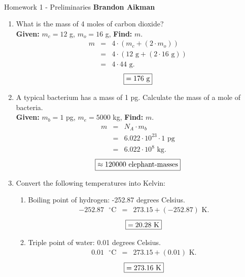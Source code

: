 \documentclass[12pt]{article}
\begin{document}
 \\
Homework 1 - Preliminaries \hfill {\bf Brandon Aikman}

\begin{enumerate}
	\item What is the mass of 4 moles of carbon dioxide? \\
	\textbf {Given: } $m_c  = 12$ g, $m_o = 16$ g, \textbf{Find: } $m$.
	\begin{eqnarray*}
		m &=& 4 \cdot (m_c + (2 \cdot m_o))\\
		&=& 4 \cdot (12 \mbox{ g} + (2 \cdot 16 \mbox{ g}))\\
		&=& 4 \cdot 44 \mbox{ g}.
	\end{eqnarray*}
	$$\fbox{$= 176$ g}$$
	
    \item A typical bacterium has a mass of 1 pg. Calculate the mass of a mole of bacteria. \\
    \textbf {Given: } $m_b = 1$ pg, $m_e  = 5000$ kg, \textbf{Find: } $m$.
    \begin{eqnarray*}
		m &=& N_A \cdot m_b\\
		&=& 6.022 \cdot 10^{23} \cdot 1 \mbox{ pg}\\
		&=& 6.022 \cdot 10^{8} \mbox{ kg}.
	\end{eqnarray*}
	$$\fbox{$\approx 120000$ elephant-masses}$$
    
    \item Convert the following temperatures into Kelvin:
    \begin{enumerate}
        \item Boiling point of hydrogen: -252.87 degrees Celsius.
        \begin{eqnarray*}
			-252.87\mbox{ $^{ \circ}$C} &=& 273.15 + (-252.87) \mbox{ K}.
		\end{eqnarray*}
		$$\fbox{$= 20.28$ K}$$
        \item Triple point of water: 0.01 degrees Celsius.
        \begin{eqnarray*}
			0.01\mbox{ $^{ \circ}$C} &=& 273.15 + (0.01) \mbox{ K}.
		\end{eqnarray*}
		$$\fbox{$= 273.16$ K}$$
    \end{enumerate}
    

\end{enumerate}
\end{document}
